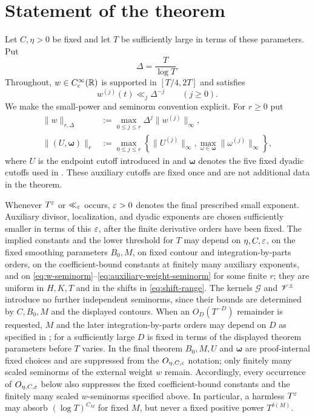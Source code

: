 \section{Statement of the theorem}\label{sec:statement}

Let $C,\eta>0$ be fixed and let $T$ be sufficiently large in terms of these
parameters.  Put
\[
                         \Delta=\frac{T}{\log T}.
\]
Throughout, $w\in C_c^\infty(\mathbb R)$ is supported in $[T/4,2T]$ and satisfies
\begin{equation}\label{eq:w-derivatives}
                  w^{(j)}(t)\ll_j\Delta^{-j}
                  \qquad (j\geq0).
\end{equation}
We make the small-power and seminorm convention explicit.  For $r\geq0$ put
\begin{align}
 \|w\|_{r,\Delta}
 &:={\max}_{0\leq j\leq r}\Delta^j\|w^{(j)}\|_\infty,
 \label{eq:w-seminorm}\\
 \|(U,\boldsymbol\omega)\|_r
 &:={\max}_{0\leq j\leq r}\left\{
   \|U^{(j)}\|_\infty,
   {\max}_{\omega\in\boldsymbol\omega}\|\omega^{(j)}\|_\infty
   \right\},
 \label{eq:auxiliary-weight-seminorm}
\end{align}
where $U$ is the endpoint cutoff introduced in  and
$\boldsymbol\omega$ denotes the five fixed dyadic cutoffs used in
.  These auxiliary cutoffs are fixed once and are not
additional data in the theorem.

Whenever $T^\varepsilon$ or $\ll_\varepsilon$ occurs, $\varepsilon>0$ denotes the final prescribed
small exponent.  Auxiliary divisor, localization, and dyadic exponents are
chosen sufficiently smaller in terms of this $\varepsilon$, after the finite
derivative orders have been fixed.  The implied constants and the lower
threshold for $T$ may depend on $\eta,C,\varepsilon$, on the fixed smoothing
parameters $B_0,M$, on fixed contour and integration-by-parts orders, on the
coefficient-bound constants at finitely many auxiliary exponents, and on
\eqref{eq:w-seminorm}--\eqref{eq:auxiliary-weight-seminorm} for some finite
$r$; they are uniform in $H,K,T$ and in the shifts in
\eqref{eq:shift-range}.  The kernels $\mathcal G$ and $\mathscr V^\pm$ introduce no
further independent seminorms, since their bounds are determined by
$C,B_0,M$ and the displayed contours.  When an $O_D(T^{-D})$ remainder is
requested, $M$ and the later integration-by-parts orders may depend on $D$ as
specified in ; for  a
sufficiently large $D$ is fixed in terms of the displayed theorem parameters
before $T$ varies.  In the final theorem $B_0,M,U$ and
 $\boldsymbol\omega$ are proof-internal fixed choices and are suppressed from
 the $O_{\eta,C,\varepsilon}$ notation; only finitely many scaled seminorms of the
 external weight $w$ remain.  Accordingly, every occurrence of
 $O_{\eta,C,\varepsilon}$ below also suppresses the fixed coefficient-bound constants
 and the finitely many scaled $w$-seminorms specified above.  In particular, a
 harmless $T^\varepsilon$ may absorb
 $(\log T)^{C_M}$ for fixed $M$, but never a fixed positive power
 $T^{\delta(M)}$.

